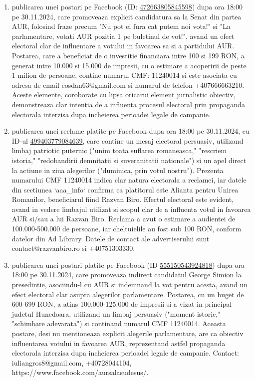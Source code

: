 \documentclass[a4paper,12pt]{article}
\begin{document}
\begin{enumerate}[leftmargin=*, label=\arabic*.)]
    \item publicarea unei postari pe Facebook (ID: \href{https://www.facebook.com/ads/library/?id=472663805845598}{472663805845598}) dupa ora 18:00 pe 30.11.2024, care promoveaza explicit candidatura sa la Senat din partea AUR, folosind fraze precum "Nu pot ei fura cat putem noi vota!" si "La parlamentare, votati AUR  pozitia 1 pe buletinul de vot!", avand un efect electoral clar de influentare a votului in favoarea sa si a partidului AUR. Postarea, care a beneficiat de o investitie financiara intre 100 si 199 RON, a generat intre 10.000 si 15.000 de impresii, cu o estimare a acoperirii de peste 1 milion de persoane, contine numarul CMF: 11240014 si este asociata cu adresa de email cosdan63@gmail.com si numarul de telefon +407666663210.  Aceste elemente, coroborate cu lipsa oricarui element jurnalistic obiectiv, demonstreaza clar intentia de a influenta procesul electoral prin propaganda electorala interzisa dupa incheierea perioadei legale de campanie.
    \item publicarea unei reclame platite pe Facebook dupa ora 18:00 pe 30.11.2024, cu ID-ul \href{https://www.facebook.com/ads/library/?id=499403779084639}{499403779084639}, care contine un mesaj electoral persuasiv, utilizand limbaj patriotic puternic ("unim toata suflarea romaneasca," "rescriem istoria," "redobandirii demnitatii si suveranitatii nationale") si un apel direct la actiune in ziua alegerilor ("duminica, prin votul nostru").  Prezenta numarului CMF 11240014 indica clar natura electorala a reclamei, iar datele din sectiunea `aaa\_info` confirma ca platitorul este Alianta pentru Unirea Romanilor, beneficiarul fiind Razvan Biro.  Efectul electoral este evident, avand in vedere limbajul utilizat si scopul clar de a influenta votul in favoarea AUR si/sau a lui Razvan Biro. Reclama a avut o estimare a audientei de 100.000-500.000 de persoane, iar cheltuielile au fost sub 100 RON, conform datelor din Ad Library.  Datele de contact ale advertiserului sunt contact@razvanbiro.ro si +40751303330.
    \item publicarea unei postari platite pe Facebook (ID \href{https://www.facebook.com/ads/library/?id=555150543924818}{555150543924818}) dupa ora 18:00 pe 30.11.2024, care promoveaza indirect candidatul George Simion la presedintie, asociindu-l cu AUR si indemnand la vot pentru acesta, avand un efect electoral clar asupra alegerilor parlamentare. Postarea, cu un buget de 600-699 RON, a atins 100.000-125.000 de impresii si a vizat in principal judetul Hunedoara, utilizand un limbaj persuasiv ("moment istoric," "schimbare adevarata") si continand numarul CMF 11240014.  Aceasta postare, desi nu mentioneaza explicit alegerile parlamentare, are ca obiectiv influentarea votului in favoarea AUR, reprezentand astfel propaganda electorala interzisa dupa incheierea perioadei legale de campanie.  Contact: iuliangros8@gmail.com, +40728044104, https://www.facebook.com/aursalasudesus/.

\end{enumerate}
\end{document}
